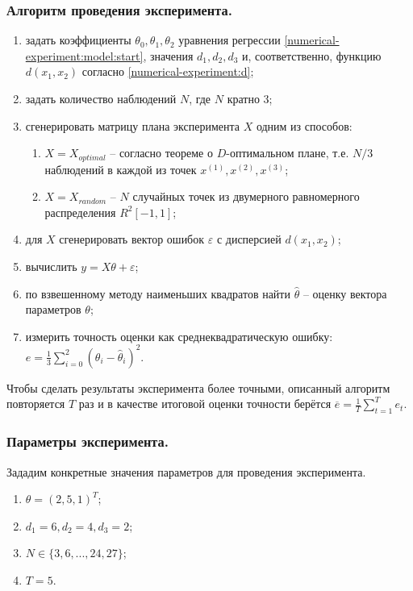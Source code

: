 \subsubsection{Алгоритм проведения эксперимента.}
\begin{enumerate}
	\item \label{numerical-experiment:algo:loop:start}задать коэффициенты $\theta_0, \theta_1, \theta_2$ уравнения регрессии \eqref{numerical-experiment:model:start}, значения $d_1, d_2, d_3$ и, соответственно, функцию $d(x_1, x_2)$ согласно \eqref{numerical-experiment:d};
	\item задать количество наблюдений $N$, где $N$ кратно 3;
	\item сгенерировать матрицу плана эксперимента $X$ одним из способов:
		\begin{enumerate}
			\item $X = X_{optimal}$ -- согласно теореме о $D$-оптимальном плане, т.е. $N/3$ наблюдений в каждой из точек $x^{(1)}, x^{(2)}, x^{(3)}$;
			\item $X = X_{random}$ -- $N$ случайных точек из двумерного равномерного распределения $R^2[-1, 1]$;
		\end{enumerate}
	\item для $X$ сгенерировать вектор ошибок $\varepsilon$ с дисперсией $d(x_1, x_2)$;
	\item вычислить $y = X \theta + \varepsilon$;
	\item по взвешенному методу наименьших квадратов найти  $\hat \theta$ -- оценку вектора параметров $\theta$;
	\item \label{numerical-experiment:algo:loop:end} измерить точность оценки как среднеквадратическую ошибку: $e = \frac 1 3 \sum_{i=0}^{2} (\theta_i - \hat \theta_i)^2$. 
\end{enumerate}

Чтобы сделать результаты эксперимента более точными, описанный алгоритм повторяется $T$ раз и в качестве итоговой оценки точности берётся $\overline e = \frac 1 T \sum_{t=1}^{T} e_t$.

\subsubsection{Параметры эксперимента.}
Зададим конкретные значения параметров для проведения эксперимента.
\begin{enumerate}
	\item $\theta = (2, 5, 1)^T$;
	\item $d_1 = 6, d_2 = 4, d_3 = 2$;
	\item $N \in \{3, 6, ..., 24, 27\}$;
	\item $T = 5$.
\end{enumerate} 

